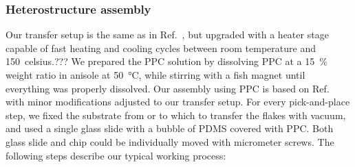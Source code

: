 \subsubsection{Heterostructure assembly}

Our transfer setup is the same as in Ref.~\cite{castellanos-gomezDeterministicTransferTwodimensional2014}, but upgraded with a heater stage capable of fast heating and cooling cycles between room temperature and \SI{150}{celsius}.???
% 
We prepared the PPC solution by dissolving PPC at a \SI{15}{\percent} weight ratio in anisole at \SI{50}{\celsius}, while stirring with a fish magnet until everything was properly dissolved.
% 
Our assembly using PPC is based on Ref.~\cite{pizzoccheroHotPickupTechnique2016} with minor modifications adjusted to our transfer setup.
% 
For every pick-and-place step, we fixed the substrate from or to which to transfer the flakes with vacuum, and used a single glass slide with a bubble of PDMS covered with PPC.
%
Both glass slide and chip could be individually moved with micrometer screws.
%
The following steps describe our typical working process:

